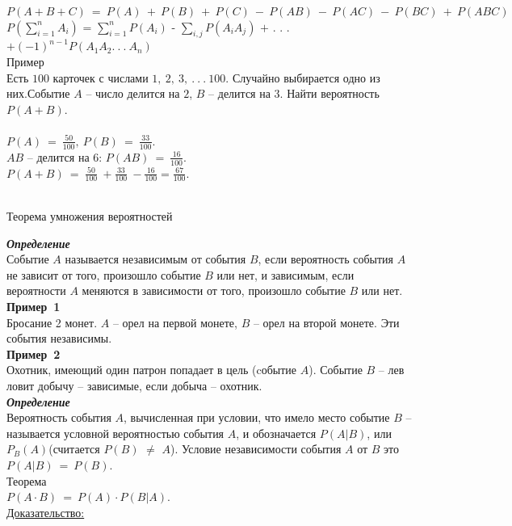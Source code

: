 \documentclass[russian, 12pt, fleqn,x11names]{article}
\begin{document}
$P(A+B+C)\  = \ P(A)\ +\ P(B)\ +\ P(C)\ -\ P(AB)\ -\  P(AC)\ -\ P(BC)\ +\ P(ABC)$\\
$
\displaystyle{
P \left( \sum\limits_{i=1}^{n}A_i  \right)
}
$
 = $\sum\limits_{i=1}^{n}P(A_i)$ - $\sum\limits_{i,j}P(A_iA_j)$ $+$ . . . $+(-1)^{n-1}P(A_1A_2 .\ .\ .\ A_n)$\\
$\textbf{Пример}$\\  Есть $100$ карточек с числами $1,\ 2,\ 3,\ .\ .\ .\ 100.$ Случайно выбирается одно из них.Событие $A$ -- число делится на $2$, $B$ -- делится на $3$. Найти вероятность $P(A+B)$.\\
\\
$P(A)\ =\ \frac{50}{100},\ P(B)\ =\ \frac{33}{100}$.\\  $AB$ -- делится на $6$: $P(AB)\ =\ \frac{16}{100}$. \\$P(A+B)\ =\ \frac{50}{100}\ + \frac{33}{100}\ -\frac{16}{100}=\frac{67}{100}$. \\\\
\begin{center}
$\textbf{Теорема умножения вероятностей }$
\end{center}
\textit{\textbf{Определение}}\\Событие $A$ называется независимым от события $B$, если вероятность события $A$ не зависит от того, произошло событие $B$ или нет, и зависимым, если вероятности $A$ меняются в зависимости от того, произошло событие $B$ или нет.\\
\textbf{Пример\ 1 }\\Бросание 2 монет. $A$ -- орел на первой монете, $B$ -- орел на второй монете. Эти события независимы.\\
\textbf{Пример\ 2 }\\Охотник, имеющий один патрон попадает в цель (cобытие $A$). Событие $B$ -- лев ловит добычу -- зависимые, если добыча -- охотник.\\
\textit{\textbf{Определение}}\\Вероятность события $A$, вычисленная при условии, что имело место событие $B$ -- называется условной вероятностью события $A$, и обозначается $P(A|B)$, или $P_B(A)$(считается $P(B)$ $\neq$ $A$). Условие независимости события $A$ от $B$ это $P(A|B)\ =\ P(B)$.\\
$\textbf{Теорема}$\\
 $P(A\cdot B)\ =\ P(A)\cdot P(B|A)$.\\
\underline{Доказательство:}
\end{document}
